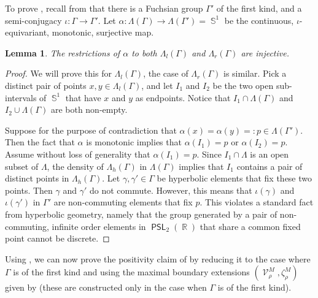 \documentclass{amsart}
\theoremstyle{plain}
\newtheorem{lemma}[proposition]{Lemma}
\theoremstyle{definition}
\DeclareMathOperator{\PSL}{\mathsf{PSL}}
\newcommand{\bdext}{{\Vc^M_\rho}}
\DeclareMathOperator{\Vc}{\mathcal{V}}
\DeclareMathOperator{\Rb}{{\mathbb{R}}}
\DeclareMathOperator{\Sb}{\mathbb{S}}
\newcommand{\1}{\mathbf{1}}
\begin{document}
To prove , recall from  that there is a Fuchsian group $\Gamma'$ of the first kind, and a semi-conjugacy $\iota:\Gamma\to\Gamma'$. Let $\alpha\colon\Lambda(\Gamma)\to  \Lambda(\Gamma') = \Sb^1$ be the continuous, $\iota$-equivariant, monotonic, surjective map.

\begin{lemma}\label{injective alpha}
The restrictions of $\alpha$ to both $\Lambda_l(\Gamma)$ and $\Lambda_r(\Gamma)$ are injective. 
\end{lemma}

\begin{proof}
We will prove this for $\Lambda_l(\Gamma)$, the case of $\Lambda_r(\Gamma)$ is similar. Pick a distinct pair of points $x,y\in\Lambda_l(\Gamma)$, and let $I_1$ and $I_2$ be the two open sub-intervals of $\Sb^1$ that have $x$ and $y$ as endpoints. Notice that $I_1\cap\Lambda(\Gamma)$ and $I_2\cup\Lambda(\Gamma)$ are both non-empty. 

Suppose for the purpose of contradiction that $\alpha(x)=\alpha(y)=:p\in\Lambda(\Gamma')$. Then the fact that $\alpha$ is monotonic implies that $\alpha(I_1)=p$ or $\alpha(I_2)=p$. Assume without loss of generality that $\alpha(I_1)=p$. Since $I_1\cap\Lambda$ is an open subset of $\Lambda$, the density of $\Lambda_h(\Gamma)$ in $\Lambda(\Gamma)$ implies that $I_1$ contains a pair of distinct points in $\Lambda_h(\Gamma)$. Let $\gamma,\gamma'\in\Gamma$ be hyperbolic elements that fix these two points. Then $\gamma$ and $\gamma'$ do not commute. However, this means that $\iota(\gamma)$ and $\iota(\gamma')$ in $\Gamma'$ are non-commuting elements that fix $p$. This violates a standard fact from hyperbolic geometry, namely that the group generated by a pair of non-commuting, infinite order elements in $\PSL_2(\Rb)$ that share a common fixed point cannot be discrete. 
\end{proof}

Using , we can now prove the positivity claim of  by reducing it to the case where $\Gamma$ is of the first kind and using the maximal boundary extensions $(\bdext,\zeta_\rho^M)$ given by  (these are constructed only in the case when $\Gamma$ is of the first kind).
\end{document}
